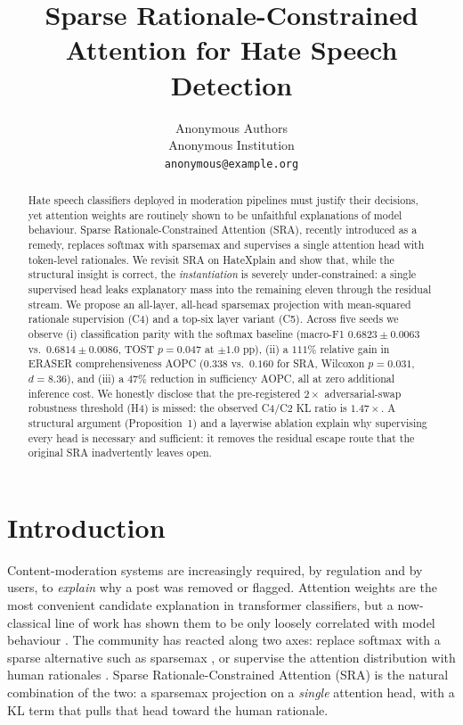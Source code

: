 \documentclass{article}
\title{Sparse Rationale-Constrained Attention for Hate Speech Detection}
\author{%
  Anonymous Authors\\
  Anonymous Institution\\
  \texttt{anonymous@example.org}
}
\begin{document}
\maketitle

\begin{abstract}
Hate speech classifiers deployed in moderation pipelines must justify their decisions, yet
attention weights are routinely shown to be unfaithful explanations of model behaviour.
Sparse Rationale-Constrained Attention (SRA), recently introduced as a remedy, replaces
softmax with sparsemax and supervises a single attention head with token-level rationales.
We revisit SRA on HateXplain and show that, while the structural insight is correct, the
\emph{instantiation} is severely under-constrained: a single supervised head leaks
explanatory mass into the remaining eleven through the residual stream. We propose an
all-layer, all-head sparsemax projection with mean-squared rationale supervision (C4) and
a top-six layer variant (C5). Across five seeds we observe (i) classification parity with
the softmax baseline (macro-F1 $0.6823 \pm 0.0063$ vs.\ $0.6814 \pm 0.0086$, TOST $p{=}0.047$
at $\pm 1.0$ pp), (ii) a $111\%$ relative gain in ERASER comprehensiveness AOPC ($0.338$
vs.\ $0.160$ for SRA, Wilcoxon $p{=}0.031$, $d{=}8.36$), and (iii) a $47\%$ reduction in
sufficiency AOPC, all at zero additional inference cost. We honestly disclose that the
pre-registered $2{\times}$ adversarial-swap robustness threshold (H4) is missed: the
observed C4/C2 KL ratio is $1.47{\times}$. A structural argument (Proposition~1) and a
layerwise ablation explain why supervising every head is necessary and sufficient: it
removes the residual escape route that the original SRA inadvertently leaves open.
\end{abstract}

\section{Introduction}
\label{sec:intro}

Content-moderation systems are increasingly required, by regulation and by users, to
\emph{explain} why a post was removed or flagged. Attention weights are the most
convenient candidate explanation in transformer classifiers, but a now-classical line of
work has shown them to be only loosely correlated with model behaviour
\citep{jain2019attention,wiegreffe2019attention}. The community has reacted along two
axes: replace softmax with a sparse alternative such as sparsemax
\citep{martins2016sparsemax,malaviya2018sparse,correia2019adaptively}, or supervise the
attention distribution with human rationales \citep{deyoung2020eraser}. Sparse
Rationale-Constrained Attention (SRA) \citep{eilertsen2025aligning} is the natural
combination of the two: a sparsemax projection on a \emph{single} attention head, with a
KL term that pulls that head toward the human rationale.
\end{document}
